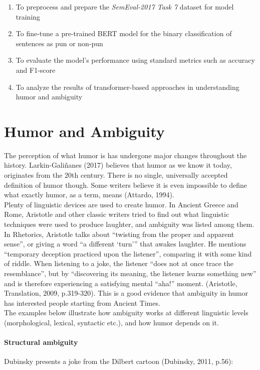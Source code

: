 \documentclass[10pt]{article}
\begin{document}
\begin{enumerate}
    \item To preprocess and prepare the \textit{SemEval-2017 Task 7} dataset for model training

    \item To fine-tune a pre-trained BERT model for the binary classification of sentences as pun or non-pun
    \item To evaluate the model’s performance using standard metrics such as accuracy and F1-score
    \item To analyze the results of transformer-based approaches in understanding humor and ambiguity
\end{enumerate}







\section{Humor and Ambiguity}

The perception of what humor is has undergone major changes throughout the history. Larkin-Galiñanes (2017) believes that humor as we know it today, originates from the 20th century. There is no single, universally accepted definition of humor though. Some writers believe it is even impossible to define what exactly humor, as a term, means (Attardo, 1994).\\[6pt]
Plenty of linguistic devices are used to create humor. In Ancient Greece and Rome, Aristotle and other classic writers tried to find out what linguistic techniques were used to produce laughter, and ambiguity was listed among them. In Rhetorics, Aristotle talks about “twisting from the proper and apparent sense”, or giving a word “a different ‘turn’” that awakes laughter. He mentions “temporary deception practiced upon the listener”, comparing it with some kind of riddle. When listening to a joke, the listener “does not at once trace the resemblance”, but by “discovering its meaning, the listener learns something new” and is therefore experiencing a satisfying mental “aha!” moment. (Aristotle, Translation, 2009, p.319-320). This is a good evidence that ambiguity in humor has interested people starting from Ancient Times.\\[6pt]
The examples below illustrate how ambiguity works at different linguistic levels (morphological, lexical, syntactic etc.), and how humor depends on it.

\paragraph{Structural ambiguity} Dubinsky presents a joke from the Dilbert cartoon (Dubinsky, 2011, p.56): 
\end{document}
